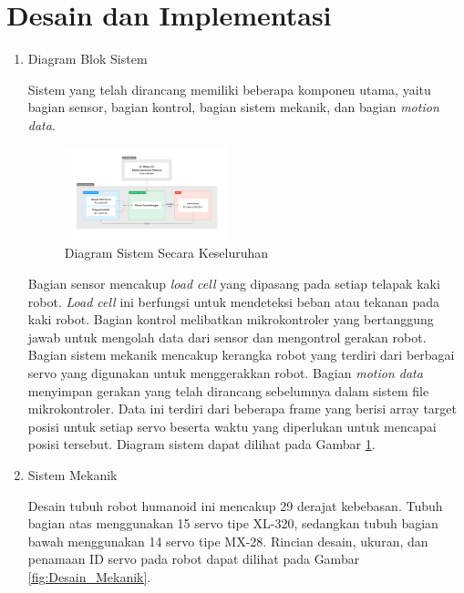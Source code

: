 \section{Desain dan Implementasi}
\label{sec:desaindanimplementasi}

\begin{enumerate}[label=\Alph*.]
    \item Diagram Blok Sistem
    \label{subsec:diagrambloksistem}

    \hspace*{1em} Sistem yang telah dirancang memiliki beberapa komponen utama, yaitu bagian sensor, bagian kontrol, bagian sistem mekanik, dan bagian \textit{motion data}. 

    \begin{figure} [h] \centering
        \includegraphics[width=0.45\textwidth]{gambar/Diagram_Sistem.png}
        \caption{Diagram Sistem Secara Keseluruhan}
        \label{fig:Diagram_Sistem}
    \end{figure}
    
    \hspace*{1em} Bagian sensor mencakup \emph{load cell} yang dipasang pada setiap telapak kaki robot. \emph{Load cell} ini berfungsi untuk mendeteksi beban atau tekanan pada kaki robot. Bagian kontrol melibatkan mikrokontroler yang bertanggung jawab untuk mengolah data dari sensor dan mengontrol gerakan robot. Bagian sistem mekanik mencakup kerangka robot yang terdiri dari berbagai servo yang digunakan untuk menggerakkan robot. Bagian \textit{motion data} menyimpan gerakan yang telah dirancang sebelumnya dalam sistem file mikrokontroler. Data ini terdiri dari beberapa frame yang berisi array target posisi untuk setiap servo beserta waktu yang diperlukan untuk mencapai posisi tersebut. Diagram sistem dapat dilihat pada Gambar \ref{fig:Diagram_Sistem}.
    
    \item Sistem Mekanik
    \label{subsec:sistemmekanik}

    \hspace*{1em} Desain tubuh robot humanoid ini mencakup 29 derajat kebebasan. Tubuh bagian atas menggunakan 15 servo tipe XL-320, sedangkan tubuh bagian bawah menggunakan 14 servo tipe MX-28. Rincian desain, ukuran, dan penamaan ID servo pada robot dapat dilihat pada Gambar \ref{fig:Desain_Mekanik}. 


\end{enumerate}
